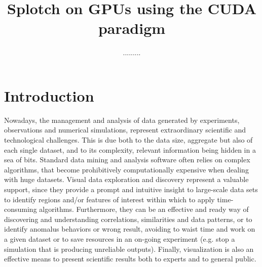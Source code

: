 \documentclass[11pt]{article}
\title{Splotch on GPUs using the CUDA paradigm}
\author{.........}
\begin{document}
\maketitle

\section{Introduction}
\label{sec:intro}

Nowadays, the management and analysis of data generated by experiments, 
observations and numerical simulations, represent extraordinary 
scientific and technological challenges.
This is due both to the data size, aggregate but also of each 
single dataset, and to its complexity, relevant information being hidden in a sea 
of bits. Standard data mining and analysis software often relies on complex
algorithms, that become prohibitively computationally expensive when dealing with 
huge datasets. Visual data exploration and discovery represent a valuable
support, since they provide a prompt and intuitive insight to
large-scale data sets to identify regions and/or features of interest within which
to apply time-consuming algorithms. 
Furthermore, they can be an effective and ready way of discovering 
and understanding correlations,
similarities and data patterns, or to identify anomalus behaviors or
wrong result, avoiding to waist time and work on a given dataset or
to save resources in an on-going experiment (e.g. stop a simulation that is producing 
unreliable outputs). Finally, visualization is also an effective means to present
scientific results both to experts and to general public.
\end{document}

